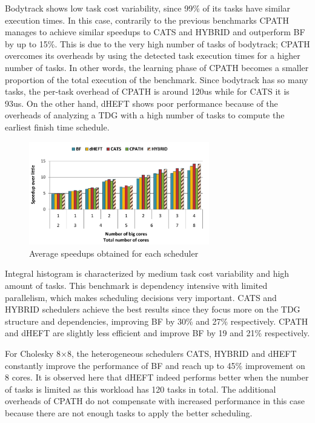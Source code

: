 Bodytrack shows low task cost variability, since 99\% of its tasks have similar execution times.
In this case, contrarily to the previous benchmarks CPATH manages to achieve similar speedups to CATS and HYBRID and outperform BF by up to 15\%.
This is due to the very high number of tasks of bodytrack; CPATH overcomes its overheads by using the detected task execution times for a higher number of tasks.
In other words, the learning phase of CPATH becomes a smaller proportion of the total execution of the benchmark.
Since bodytrack has so many tasks, the per-task overhead of CPATH is around 120us while for CATS it is 93us.
On the other hand, dHEFT shows poor performance because of the overheads of analyzing a TDG with a high number of tasks to compute the earliest finish time schedule.

\begin{figure}[!tr]
	\centering
  	\includegraphics[width=0.7\textwidth]{figures/average_all.pdf}
  	\caption{Average speedups obtained for each scheduler}
  	\label{avg_all}
  	\vspace{-0.5cm}
\end{figure}  


Integral histogram is characterized by medium task cost variability and high amount of tasks.
This benchmark is dependency intensive with limited parallelism, which makes scheduling decisions very important.
CATS and HYBRID schedulers achieve the best results since they focus more on the TDG structure and dependencies, improving BF by 30\% and 27\% respectively.
CPATH and dHEFT are slightly less efficient and improve BF by 19 and 21\% respectively.


For Cholesky 8$\times$8, the heterogeneous schedulers CATS, HYBRID and dHEFT constantly improve the performance of BF and reach up to 45\% improvement on 8 cores.
It is observed here that dHEFT indeed performs better when the number of tasks is limited as this workload has 120 tasks in total.
The additional overheads of CPATH do not compensate with increased performance in this case because there are not enough tasks to apply the better scheduling.

